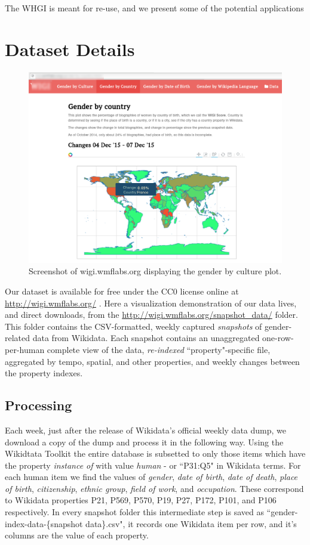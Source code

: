 \documentclass[letterpaper]{article}
\begin{document}
The WHGI is meant for re-use, and we present some of the potential applications 

\section{Dataset Details}

\begin{figure}
\label{fig:screenshot}
\includegraphics[scale=0.2]{figures/website_screenshot.png} 
\caption{Screenshot of wigi.wmflabs.org displaying the gender by culture plot.}
\end{figure}

Our dataset is available for free under the CC0 license online at  \url{http://wigi.wmflabs.org/} . Here a visualization demonstration of our data lives, and direct downloads, from the \url{http://wigi.wmflabs.org/snapshot_data/} folder. 	This folder contains the CSV-formatted, weekly captured \textit{snapshots} of gender-related data from Wikidata. Each snapshot contains an unaggregated one-row-per-human complete view of the data, \textit{re-indexed} ``property"-specific file, aggregated by tempo, spatial, and other properties, and weekly changes between the property indexes.

\subsection{Processing}
Each week, just after the release of Wikidata's official weekly data dump, we download a copy of the dump and process it in the following way. Using the Wikidtata Toolkit \cite{kroetsch} the entire database is subsetted to only those items which have the property \textit{instance of} with value \textit{human} - or ``P31:Q5" in Wikidata terms. For each human item we find the values of \textit{gender}, \textit{date of birth}, \textit{date of death}, \textit{place of birth}, \textit{citizenship}, \textit{ethnic group}, \textit{field of work}, and \textit{occupation}. These correspond to Wikidata properties P21, P569, P570, P19, P27, P172, P101, and P106 respectively.  In every snapshot folder this intermediate step is saved as ``gender-index-data-\{snapshot data\}.csv", it records one Wikidata item per row, and it's columns are the value of each property.
 
\end{document}
